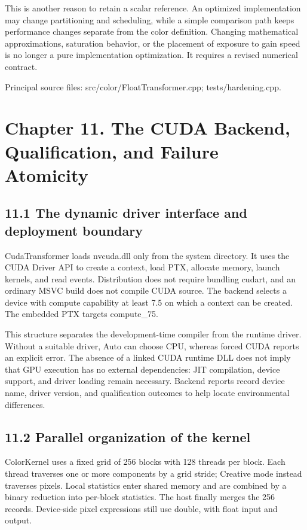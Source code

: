 \documentclass[11pt,a4paper,openany]{book}
\begin{document}
This is another reason to retain a scalar reference. An optimized implementation may change partitioning and scheduling, while a simple comparison path keeps performance changes separate from the color definition. Changing mathematical approximations, saturation behavior, or the placement of exposure to gain speed is no longer a pure implementation optimization. It requires a revised numerical contract.


\par\small Principal source files: src/color/FloatTransformer.cpp; tests/hardening.cpp.\normalsize

\chapter*{Chapter 11. The CUDA Backend, Qualification, and Failure Atomicity}

\section*{11.1 The dynamic driver interface and deployment boundary}
CudaTransformer loads nvcuda.dll only from the system directory. It uses the CUDA Driver API to create a context, load PTX, allocate memory, launch kernels, and read events. Distribution does not require bundling cudart, and an ordinary MSVC build does not compile CUDA source. The backend selects a device with compute capability at least 7.5 on which a context can be created. The embedded PTX targets compute\_75.

This structure separates the development-time compiler from the runtime driver. Without a suitable driver, Auto can choose CPU, whereas forced CUDA reports an explicit error. The absence of a linked CUDA runtime DLL does not imply that GPU execution has no external dependencies: JIT compilation, device support, and driver loading remain necessary. Backend reports record device name, driver version, and qualification outcomes to help locate environmental differences.


\section*{11.2 Parallel organization of the kernel}
ColorKernel uses a fixed grid of 256 blocks with 128 threads per block. Each thread traverses one or more components by a grid stride; Creative mode instead traverses pixels. Local statistics enter shared memory and are combined by a binary reduction into per-block statistics. The host finally merges the 256 records. Device-side pixel expressions still use double, with float input and output.
\end{document}
